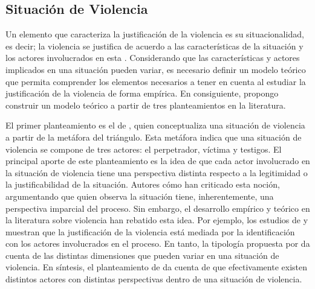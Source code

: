 \documentclass[12pt,twoside]{templates/facsothesis}
\begin{document}
\hypertarget{situaciuxf3n-de-violencia}{%
\subsection{Situación de Violencia}\label{situaciuxf3n-de-violencia}}

Un elemento que caracteriza la justificación de la violencia es su situacionalidad, es decir; la violencia se justifica de acuerdo a las características de la situación y los actores involucrados en esta \citep{Thompson2004, Johnson2009}. Considerando que las características y actores implicados en una situación pueden variar, es necesario definir un modelo teórico que permita comprender los elementos necesarios a tener en cuenta al estudiar la justificación de la violencia de forma empírica. En consiguiente, propongo construir un modelo teórico a partir de tres planteamientos en la literatura.

El primer planteamiento es el de \citet{Riches1986}, quien conceptualiza una situación de violencia a partir de la metáfora del triángulo. Esta metáfora indica que una situación de violencia se compone de tres actores: el perpetrador, víctima y testigos. El principal aporte de este planteamiento es la idea de que cada actor involucrado en la situación de violencia tiene una perspectiva distinta respecto a la legitimidad o la justificabilidad de la situación. Autores cómo \citet{Bufacchi2007} han criticado esta noción, argumentando que quien observa la situación tiene, inherentemente, una perspectiva imparcial del proceso. Sin embargo, el desarrollo empírico y teórico en la literatura sobre violencia han rebatido esta idea. Por ejemplo, los estudios de \citet{Gerber2017a} y \citet{Gerber2021} muestran que la justificación de la violencia está mediada por la identificación con los actores involucrados en el proceso. En tanto, la tipología propuesta por \citet{Imbusch2005} da cuenta de las distintas dimensiones que pueden variar en una situación de violencia. En síntesis, el planteamiento de \citet{Riches1986} da cuenta de que efectivamente existen distintos actores con distintas perspectivas dentro de una situación de violencia.
\end{document}
